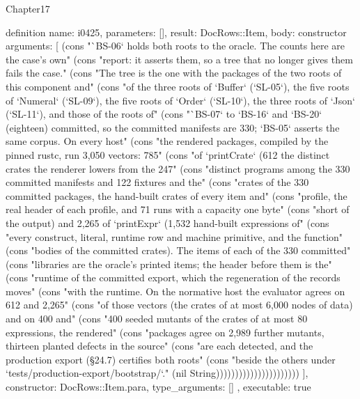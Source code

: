 \begin{lexlean}{Chapter17}
\begin{semanticmodule}
definition{
  name: i0425,
  parameters: [],
  result: DocRows::Item,
  body: constructor{
    arguments: [
      (cons "`BS-06` holds both roots to the oracle. The counts here are the case's own" (cons "report: it asserts them, so a tree that no longer gives them fails the case." (cons "The tree is the one with the packages of the two roots of this component and" (cons "of the three roots of `Buffer` (`SL-05`), the five roots of `Numeral` (`SL-09`), the five roots of `Order` (`SL-10`), the three roots of `Json` (`SL-11`), and those of the roots of" (cons "`BS-07` to `BS-16` and `BS-20` (eighteen) committed, so the committed manifests are 330; `BS-05` asserts the same corpus. On every host" (cons "the rendered packages, compiled by the pinned rustc, run 3,050 vectors: 785" (cons "of `printCrate` (612 the distinct crates the renderer lowers from the 247" (cons "distinct programs among the 330 committed manifests and 122 fixtures and the" (cons "crates of the 330 committed packages, the hand-built crates of every item and" (cons "profile, the real header of each profile, and 71 runs with a capacity one byte" (cons "short of the output) and 2,265 of `printExpr` (1,532 hand-built expressions of" (cons "every construct, literal, runtime row and machine primitive, and the function" (cons "bodies of the committed crates). The items of each of the 330 committed" (cons "libraries are the oracle's printed items; the header before them is the" (cons "runtime of the committed export, which the regeneration of the records moves" (cons "with the runtime. On the normative host the evaluator agrees on 612 and 2,265" (cons "of those vectors (the crates of at most 6,000 nodes of data) and on 400 and" (cons "400 seeded mutants of the crates of at most 80 expressions, the rendered" (cons "packages agree on 2,989 further mutants, thirteen planted defects in the source" (cons "are each detected, and the production export (§24.7) certifies both roots" (cons "beside the others under `tests/production-export/bootstrap/`." (nil String))))))))))))))))))))))
    ],
    constructor: DocRows::Item.para,
    type_arguments: []
  },
  executable: true
}


\end{semanticmodule}
\end{lexlean}
